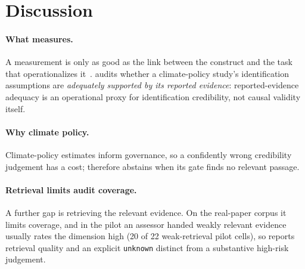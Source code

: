 \section{Discussion}
\label{sec:discussion}

\paragraph{What \sys{} measures.} A measurement is only as good as the link
between the construct and the task that operationalizes
it~\cite{jacobs2021measurement,raji2021benchmark}. \sys{} audits whether a
climate-policy study's identification assumptions are \emph{adequately supported
by its reported evidence}: reported-evidence adequacy is an operational proxy for
identification credibility, not causal validity itself.

\paragraph{Why climate policy.} Climate-policy estimates inform governance,
so a confidently wrong credibility judgement has a cost; \sys{} therefore
abstains when its gate finds no relevant passage.

\paragraph{Retrieval limits audit coverage.} A further gap is retrieving the
relevant evidence. On the
real-paper corpus it limits coverage, and in the pilot an assessor handed
weakly relevant evidence usually rates the dimension high (20 of 22
weak-retrieval pilot cells), so \sys{} reports retrieval quality and an
explicit \texttt{unknown} distinct from a substantive high-risk judgement.

